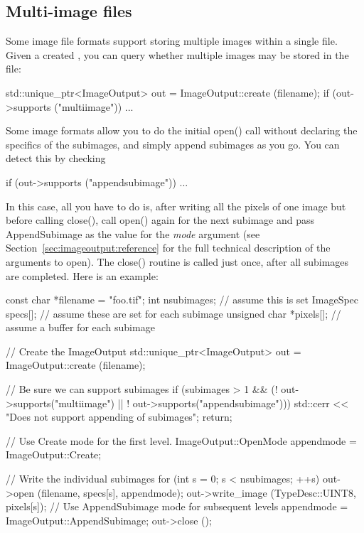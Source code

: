 \subsection{Multi-image files}
\label{sec:imageoutput:multiimage}

Some image file formats support storing multiple images within a single
file.  Given a created \ImageOutput, you can query whether multiple
images may be stored in the file:

\begin{code}
        std::unique_ptr<ImageOutput> out = ImageOutput::create (filename);
        if (out->supports ("multiimage"))
            ...
\end{code}

Some image formats allow you to do the initial {\cf open()} call
without declaring the specifics of the subimages, and simply append
subimages as you go.  You can detect this by checking
\begin{code}
        if (out->supports ("appendsubimage"))
            ...
\end{code}

In this case, all you have to do is, after writing all the pixels of one
image but before calling {\cf close()}, call {\cf open()} again for the
next subimage and pass {\cf AppendSubimage} as the value for the
\emph{mode} argument (see Section~\ref{sec:imageoutput:reference} for
the full technical description of the arguments to {\cf open}).  The
{\cf close()} routine is called just once, after all subimages are
completed.  Here is an example:

\begin{code}
        const char *filename = "foo.tif";
        int nsubimages;     // assume this is set
        ImageSpec specs[];  // assume these are set for each subimage
        unsigned char *pixels[]; // assume a buffer for each subimage

        // Create the ImageOutput
        std::unique_ptr<ImageOutput> out = ImageOutput::create (filename);

        // Be sure we can support subimages
        if (subimages > 1 &&  (! out->supports("multiimage") ||
                               ! out->supports("appendsubimage"))) {
            std::cerr << "Does not support appending of subimages\n";
            return;
        }

        // Use Create mode for the first level.
        ImageOutput::OpenMode appendmode = ImageOutput::Create;

        // Write the individual subimages
        for (int s = 0;  s < nsubimages;  ++s) {
            out->open (filename, specs[s], appendmode);
            out->write_image (TypeDesc::UINT8, pixels[s]);
            // Use AppendSubimage mode for subsequent levels
            appendmode = ImageOutput::AppendSubimage;
        }
        out->close ();
\end{code}


